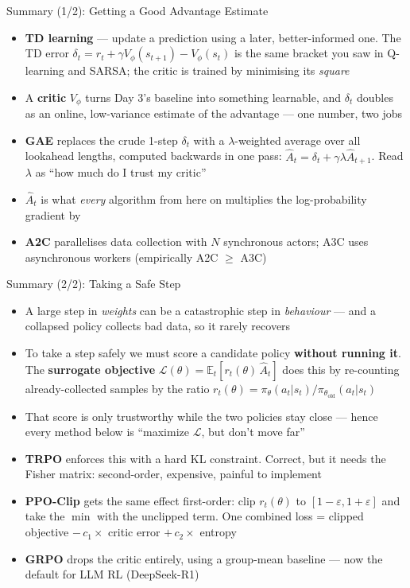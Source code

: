 \begin{frame}{Summary (1/2): Getting a Good Advantage Estimate}
\begin{itemize}
    \item \textbf{TD learning} --- update a prediction using a later, better-informed one. The TD error $\delta_t = r_t + \gamma V_\phi(s_{t+1}) - V_\phi(s_t)$ is the same bracket you saw in Q-learning and SARSA; the critic is trained by minimising its \emph{square}
    \item A \textbf{critic} $V_\phi$ turns Day 3's baseline into something learnable, and $\delta_t$ doubles as an online, low-variance estimate of the advantage --- one number, two jobs
    \item \textbf{GAE} replaces the crude 1-step $\delta_t$ with a $\lambda$-weighted average over all lookahead lengths, computed backwards in one pass: $\hat{A}_t = \delta_t + \gamma\lambda \hat{A}_{t+1}$. Read $\lambda$ as ``how much do I trust my critic''
    \item $\hat{A}_t$ is what \emph{every} algorithm from here on multiplies the log-probability gradient by
    \item \textbf{A2C} parallelises data collection with $N$ synchronous actors; A3C uses asynchronous workers (empirically A2C $\geq$ A3C)
\end{itemize}
\end{frame}

\begin{frame}{Summary (2/2): Taking a Safe Step}
\begin{itemize}
    \item A large step in \emph{weights} can be a catastrophic step in \emph{behaviour} --- and a collapsed policy collects bad data, so it rarely recovers
    \item To take a step safely we must score a candidate policy \textbf{without running it}. The \textbf{surrogate objective} $\mathcal{L}(\theta) = \mathbb{E}_t[r_t(\theta)\,\hat{A}_t]$ does this by re-counting already-collected samples by the ratio $r_t(\theta) = \pi_\theta(a_t|s_t)/\pi_{\theta_\text{old}}(a_t|s_t)$
    \item That score is only trustworthy while the two policies stay close --- hence every method below is ``maximize $\mathcal{L}$, but don't move far''
    \item \textbf{TRPO} enforces this with a hard KL constraint. Correct, but it needs the Fisher matrix: second-order, expensive, painful to implement
    \item \textbf{PPO-Clip} gets the same effect first-order: clip $r_t(\theta)$ to $[1{-}\varepsilon, 1{+}\varepsilon]$ and take the $\min$ with the unclipped term. One combined loss = clipped objective $-\,c_1\times$ critic error $+\,c_2\times$ entropy
    \item \textbf{GRPO} drops the critic entirely, using a group-mean baseline --- now the default for LLM RL (DeepSeek-R1)
\end{itemize}
\end{frame}

